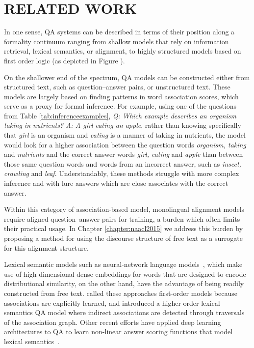 \chapter{RELATED WORK\label{chapter:related_work}}

In one sense, QA systems can be described in terms of their position along a formality continuum ranging from shallow models that rely on information retrieval, lexical semantics, or alignment, to highly structured models based on first order logic (as depicted in Figure ).

On the shallower end of the spectrum,  QA models can be constructed either from structured text, such as question--answer pairs, or unstructured text.  These models are largely based on finding patterns in word association scores, which serve as a proxy for formal inference.  For example, using one of the questions from Table \ref{tab:inferenceexamples}, \emph{Q: Which example describes an organism taking in nutrients? A: A girl eating an apple}, rather than knowing specifically that \emph{girl} is an organism and \emph{eating} is a manner of taking in nutrients, the model would look for a higher association between the question words \emph{organism, taking} and \emph{nutrients} and the correct answer words \emph{girl, eating} and \emph{apple} than between those same question words and words from an incorrect answer, such as \emph{insect, crawling} and \emph{leaf}.  Understandably, these methods struggle with more complex inference and with lure answers which are close associates with the correct answer. 

Within this category of association-based model, monolingual alignment models~\citep{Berger:00,echihabi2003noisy,Soricut:06,Riezler:etal:2007,Surdeanu:11,yao2013}  require aligned question--answer pairs for training, a burden which often limits their practical usage.  In Chapter \ref{chapter:naacl2015} we address this burden by proposing a method for using the discourse structure of free text as a surrogate for this alignment structure. %

Lexical semantic models such as neural-network language models~\citep{jansen14,sultan-etal:2014:TACL,yih13}, which make use of high-dimensional dense embeddings for words that are designed to encode distributional similarity, on the other hand, have the advantage of being readily constructed from free text.  
\citet{fried2015higher} called these approaches first-order models because associations are explicitly learned, and introduced a higher-order lexical semantics QA model where indirect associations are detected through traversals of the association graph.  
Other recent efforts have applied deep learning architectures to QA to learn non-linear answer scoring functions that model lexical semantics~\citep{Iyyer2014,nips15_hermann}.

